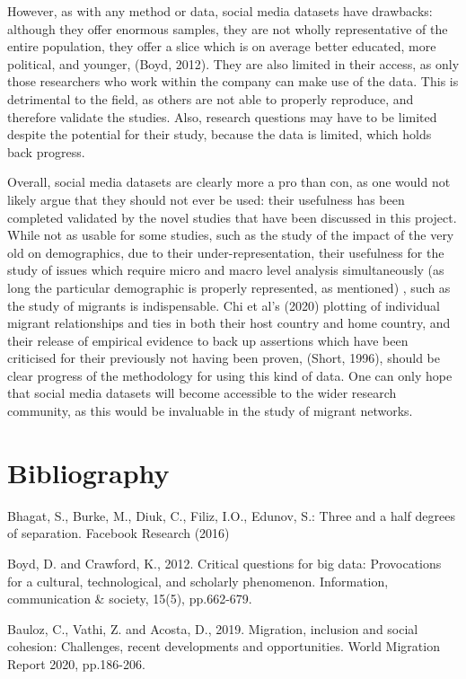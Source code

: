 \documentclass[12pt]{article}
\begin{document}
However, as with any method or data, social media datasets have drawbacks: although they offer 
enormous samples, they are not wholly representative of the entire population, they 
offer a slice which is on average better educated, more political, and younger, (Boyd, 2012). 
They are also limited in their access, as only those researchers who work within the company 
can make use of the data. This is detrimental to the field, as others are not able 
to properly reproduce, and therefore validate the studies. Also, research questions 
may have to be limited despite the potential for their study, because the data is limited, 
which holds back progress. 

Overall, social media datasets are clearly more a pro than con, as one would not likely 
argue that they should not ever be used: their usefulness has been completed validated by 
the novel studies that have been discussed in this project. While not as usable for some 
studies, such as the study of the impact of the very old on demographics, due to their 
under-representation, their usefulness for the study of issues which require micro and macro 
level analysis simultaneously (as long the particular demographic is properly represented, as mentioned)
, such as the study of migrants is indispensable. Chi et al's (2020) plotting of 
individual migrant relationships and ties in both their host country and home country, 
and their release of empirical evidence to back up assertions which have been criticised for their previously 
not having been proven, (Short, 1996), should be clear progress of the methodology for 
using this kind of data. One can only hope that social media datasets will 
become accessible to the wider 
research community, as this would be invaluable in the study of migrant networks.


\pagebreak 
\section{Bibliography}

Bhagat, S., Burke, M., Diuk, C., Filiz, I.O., Edunov, S.: Three and a half degrees
of separation. Facebook Research (2016)

Boyd, D. and Crawford, K., 2012. Critical questions for big data: Provocations for a cultural, technological, and scholarly phenomenon. Information, communication \& society, 15(5), pp.662-679.

Bauloz, C., Vathi, Z. and Acosta, D., 2019. Migration, inclusion and social cohesion: Challenges, recent developments and opportunities. World Migration Report 2020, pp.186-206.
\end{document}
